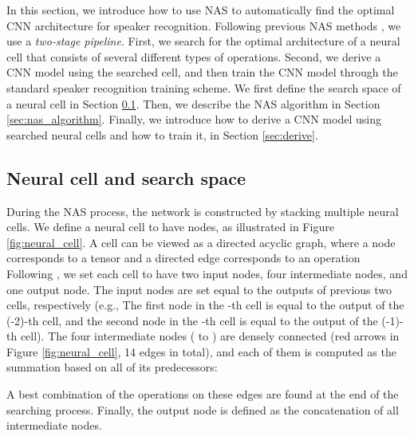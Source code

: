 \documentclass[a4paper]{article}
\begin{document}
In this section, we introduce how to use NAS to automatically find the optimal CNN architecture for speaker recognition. Following previous NAS methods \cite{liu2018darts, zoph2016neural}, we use a \textit{two-stage pipeline}. First, we search for the optimal architecture of a neural cell that consists of several different types of operations. Second, we derive a CNN model using the searched cell, and then train the CNN model through the standard speaker recognition training scheme. We first define the search space of a neural cell in Section \ref{sec:search_space}. Then, we describe the NAS algorithm in Section \ref{sec:nas_algorithm}. Finally, we introduce how to derive a CNN model using searched neural cells and how to train it, in Section \ref{sec:derive}.

\subsection{Neural cell and search space}
\label{sec:search_space}

During the NAS process, the network is constructed by stacking multiple neural cells. We define a neural cell to have  nodes, as illustrated in Figure \ref{fig:neural_cell}. A cell can be viewed as a directed acyclic graph, where a node  corresponds to a tensor and a directed edge  corresponds to an operation   Following \cite{liu2018darts, zoph2016neural, real2019regularized, liu2018progressive}, we set each cell to have two input nodes,  four intermediate nodes, and one output node. The input nodes are set equal to the outputs of previous two cells, respectively (e.g., The first node  in the -th cell is equal to the output of the (-2)-th cell, and the second node  in the -th cell is equal to the output of the (-1)-th cell). The four intermediate nodes ( to ) are densely connected (red arrows in Figure \ref{fig:neural_cell}, 14 edges in total), and each of them is computed as the summation based on all of its predecessors:



\noindent
A best combination of the operations on these edges are found at the end of the searching process. Finally, the output node  is defined as the concatenation of all intermediate nodes.
\end{document}
